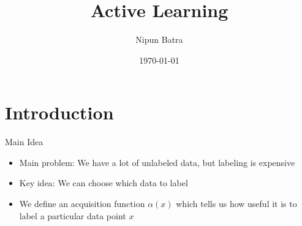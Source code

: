 \documentclass[handout]{beamer}
\begin{document}
\title{Active Learning}
\author{Nipun Batra}
\date{\today}
\maketitle

\section{Introduction}

\begin{frame}{Main Idea}
    \begin{itemize}
        \item Main problem: We have a lot of unlabeled data, but labeling is expensive
        \item Key idea: We can choose which data to label
        \item We define an acquisition function $\alpha(x)$ which tells us how useful it is to label a particular data point $x$
    \end{itemize}
    
\end{frame}
\end{document}
